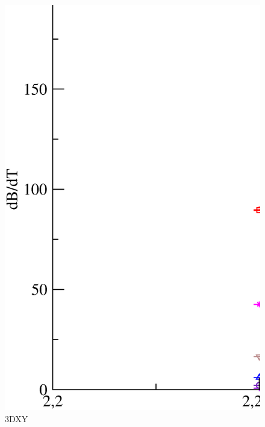 \begin{figure}[!htpb]
  \centering
  \includegraphics[width=15cm]{./plots/3DXY/3DXY_dBdT_vs_Temperature.eps}
  \caption{3DXY}
\end{figure}

